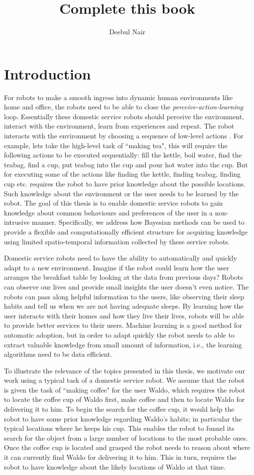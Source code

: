 \documentclass[11pt]{book}
\title{\textbf{Complete this book }}
\author{Deebul Nair}
\date{}
\begin{document}
\chapter{Introduction}


For robots to make a smooth ingress into dynamic human environments like home and office, the robots need to be able to close the \emph{perceive-action-learning} loop. Essentially these domestic service robots should perceive the environment, interact with the environment, learn from experiences and repeat. The robot interacts with the environment by choosing a sequence of low-level actions . For example, lets take the high-level task of ``making tea", this will require the following actions to be executed sequentially: fill the kettle, boil water, find the teabag, find a cup, put teabag into the cup and pour hot water into the cup. But for executing some of the actions like finding the kettle, finding teabag, finding cup etc. requires the robot to have prior knowledge about the possible locations. Such knowledge about the environment or the user needs to be learned by the robot. The goal of this thesis is to enable domestic service robots to gain knowledge about common behaviours and preferences of the user in a non-intrusive manner. Specifically, we address how Bayesian methods can be used to provide a flexible and computationally efficient structure for acquiring knowledge using limited spatio-temporal information collected by these service robots.

Domestic service robots need to have the ability to automatically and quickly adapt to a new environment. Imagine if the robot could learn how the user arranges the breakfast table by looking at the data from previous days? Robots can observe our lives and provide small insights the user doesn’t even notice. The robots can pass along helpful information to the users, like observing their sleep habits and tell us when we are not having adequate sleeps. By learning how the user interacts with their homes and how they live their lives, robots will be able to provide better services to their users. Machine learning is a good method for automatic adoption, but in order to adapt quickly the robot needs to able to extract valuable knowledge from small amount of information, i.e., the learning algorithms need to be data efficient.

To illustrate the relevance of the topics presented in this thesis, we motivate our work using a typical task of a domestic service robot.   We assume that the robot is given the task of ``making coffee" for the user Waldo, which requires the robot to locate the coffee cup of Waldo first, make coffee and then to locate Waldo for delivering it to him. To begin the search for the coffee cup, it would help the robot to have some prior knowledge regarding Waldo's habits; in particular the typical locations where he keeps his cup. This enables the robot to funnel its search for the object from a large number of locations to the most probable ones. Once the coffee cup is located and grasped the robot needs to reason about where it can currently find Waldo for delivering it to him. This in turn, requires the robot to have knowledge about the likely locations of Waldo at that time.
\end{document}
